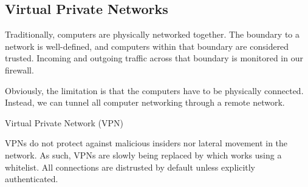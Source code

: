 \subsection*{Virtual Private Networks}

Traditionally, computers are physically networked together. The boundary to a network is well-defined, and computers within that boundary are considered trusted. Incoming and outgoing traffic across that boundary is monitored in our firewall.

Obviously, the limitation is that the computers have to be physically connected. Instead, we can tunnel all computer networking through a remote network.

\begin{dfnbox}{Virtual Private Network (VPN)}{}

\end{dfnbox}

VPNs do not protect against malicious insiders nor lateral movement in the network. As such, VPNs are slowly being replaced by  which works using a whitelist. All connections are distrusted by default unless explicitly authenticated.
